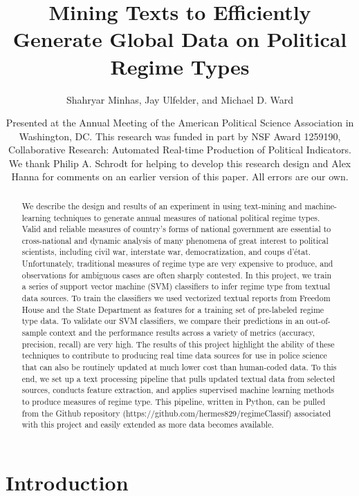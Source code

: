 \documentclass[pdftex,12pt,fullpage,oneside]{amsart}
\title{Mining Texts to Efficiently Generate Global Data on Political Regime Types}
\author{Shahryar Minhas, Jay Ulfelder, and Michael D. Ward}
\date{Presented at the Annual Meeting of the American Political Science Association in Washington, DC. This research was funded in part by NSF Award 1259190, Collaborative Research: Automated Real-time Production of Political Indicators. We thank Philip A. Schrodt for helping to develop this research design and Alex Hanna for comments on an earlier version of this paper. All errors are our own.}
\begin{document}
\maketitle

\singlespacing
\begin{abstract}
We describe the design and results of an experiment in using text-mining and machine-learning techniques to generate annual measures of national political regime types. Valid and reliable measures of country's forms of national government are essential to cross-national and dynamic analysis of many phenomena of great interest to political scientists, including civil war, interstate war, democratization, and coups d'\'{e}tat. Unfortunately, traditional measures of regime type are very expensive to produce, and observations for ambiguous cases are often sharply contested. In this project, we train a series of support vector machine (SVM) classifiers to infer regime type from textual data sources. To train the classifiers we used vectorized textual reports from Freedom House and the State Department as features for a training set of pre-labeled regime type data. To validate our SVM classifiers, we compare their predictions in an out-of-sample context and the performance results across a variety of metrics (accuracy, precision, recall) are very high. The results of this project highlight the ability of these techniques to contribute to producing real time data sources for use in police science that can also be routinely updated at much lower cost than human-coded data. To this end, we set up a text processing pipeline that pulls updated textual data from selected sources, conducts feature extraction, and applies supervised machine learning methods to produce measures of regime type. This pipeline, written in Python, can be pulled from the Github repository (https://github.com/hermes829/regimeClassif) associated with this project and easily extended as more data becomes available.
\end{abstract} 

\newpage
\newpage\setcounter{page}{1} 
\doublespacing

\section{Introduction}
\end{document}
